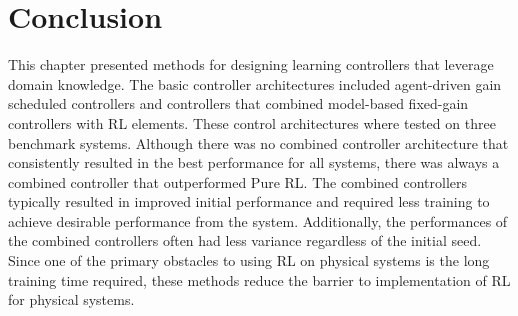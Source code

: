 


\section{Conclusion}

This chapter presented methods for designing learning controllers that leverage domain knowledge. The basic controller architectures included agent-driven gain scheduled controllers and controllers that combined model-based fixed-gain controllers with RL elements.
These control architectures where tested on three benchmark systems. Although there was no combined controller architecture that consistently resulted in the best performance for all systems, there was always a combined controller that outperformed Pure RL. The combined controllers typically resulted in improved initial performance and required less training to achieve desirable performance from the system. Additionally, the performances of the combined controllers often had less variance regardless of the initial seed. Since one of the primary obstacles to using RL on physical systems is the long training time required, these methods reduce the barrier to implementation of RL for physical systems.
